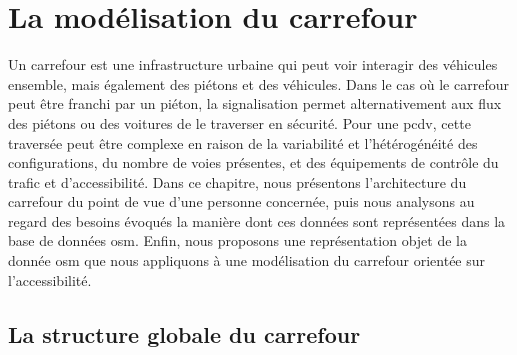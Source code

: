 \chapter{La modélisation du carrefour}

\label{chap:modelisation}


Un carrefour est une infrastructure urbaine qui peut voir interagir des véhicules ensemble, mais également des piétons et des véhicules. Dans le cas où le carrefour peut être franchi par un piéton, la signalisation permet alternativement aux flux des piétons ou des voitures de le traverser en sécurité. Pour une \gls{pcdv}, cette traversée peut être complexe en raison de la variabilité et l'hétérogénéité des configurations, du nombre de voies présentes, et des équipements de contrôle du trafic et d'accessibilité. Dans ce chapitre, nous présentons l'architecture du carrefour du point de vue d'une personne concernée, puis nous analysons au regard des besoins évoqués la manière dont ces données sont représentées dans la base de données \gls{osm}. Enfin, nous proposons une représentation objet de la donnée \gls{osm} que nous appliquons à une modélisation du carrefour orientée sur l'accessibilité.


\section{La structure globale du carrefour}


